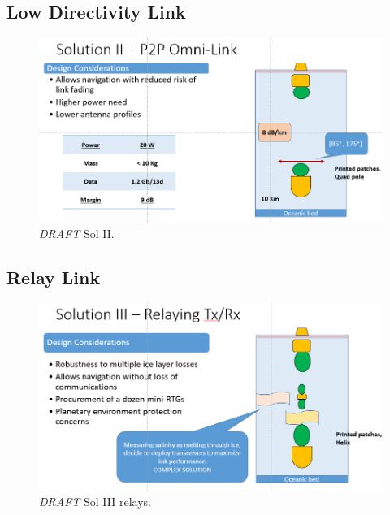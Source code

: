 %

\subsection{Low Directivity Link}
\begin{figure}[htb]
	\centering
	\includegraphics[width=\textwidth]{figures/comms/iceLink-p2p-LowD}
	\caption{ \textit{DRAFT} Sol II.}
	\label{fig:iceLink-p2p-LowD}
\end{figure}

\subsection{Relay Link}
\begin{figure}[htb]
	\centering
	\includegraphics[width=\textwidth]{figures/comms/iceLink-relay}
	\caption{ \textit{DRAFT} Sol III relays.}
	\label{fig:iceLink-relay}
\end{figure}
